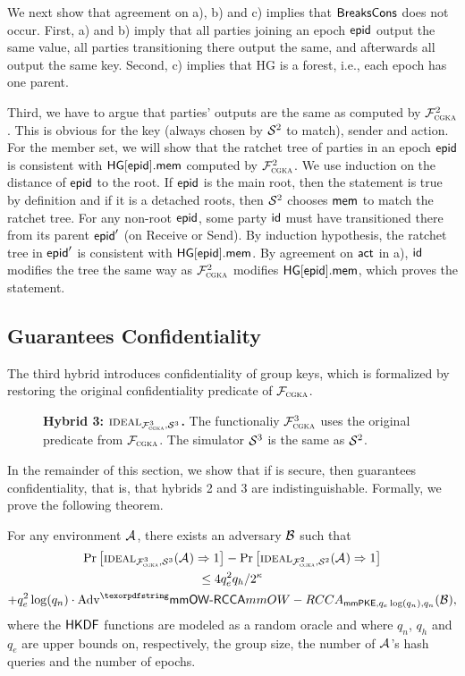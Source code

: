 We next show that agreement on a), b) and c) implies that $\textnormal{\textsf{BreaksCons}}$ does not occur. First, a) and b) imply that all parties joining an epoch ${\normalfont\textsf{epid}}$ output the same value, all parties transitioning there output the same, and afterwards all output the same key. Second, c) implies that HG is a forest, i.e., each epoch has one parent.

Third, we have to argue that parties' outputs are the same as computed by $\mathcal{F}_{\normalfont\textsc{cgka}}^2$. This is obvious for the key (always chosen by $\mathcal{S}_{\textsc{\relax}}^2$ to match), sender and action. For the member set, we will show that the ratchet tree of parties in an epoch ${\normalfont\textsf{epid}}$ is consistent with ${\mathsf{HG}}[{\normalfont\textsf{epid}}].\mathsf{mem}$ computed by $\mathcal{F}_{\normalfont\textsc{cgka}}^2$. We use induction on the distance of ${\normalfont\textsf{epid}}$ to the root. If ${\normalfont\textsf{epid}}$ is the main root, then the statement is true by definition and if it is a  detached roots, then $\mathcal{S}_{\textsc{\relax}}^2$ chooses $\mathsf{mem}$ to match the ratchet tree. For any non-root ${\normalfont\textsf{epid}}$, some party ${\mathsf{id}}$ must have transitioned there from its parent ${\normalfont\textsf{epid}}'$ (on Receive or Send). By induction hypothesis, the ratchet tree in ${\normalfont\textsf{epid}}'$ is consistent with ${\mathsf{HG}}[{\normalfont\textsf{epid}}].\mathsf{mem}$. By agreement on $\mathsf{act}$ in a), ${\mathsf{id}}$ modifies the tree the same way as $\mathcal{F}_{\normalfont\textsc{cgka}}^2$ modifies ${\mathsf{HG}}[{\normalfont\textsf{epid}}].\mathsf{mem}$, which proves the statement.

\subsection{\saik Guarantees Confidentiality}\label{sec:protsec4}
The third hybrid introduces confidentiality of group keys, which is formalized by restoring the original confidentiality predicate of $\mathcal{F}_{\normalfont\textsc{cgka}}$.
\begin{description}
\item[] {\bf Hybrid 3: $\textnormal{\textsc{ideal}}_{\mathcal{F}_{\normalfont\textsc{cgka}}^3, \mathcal{S}_{\textsc{\relax}}^3}$.} The functionaliy $\mathcal{F}_{\normalfont\textsc{cgka}}^3$ uses the original \KwConf{} predicate from $\mathcal{F}_{\normalfont\textsc{cgka}}$. The simulator $\mathcal{S}_{\textsc{\relax}}^3$ is the same as $\mathcal{S}_{\textsc{\relax}}^2$.
\end{description}

In the remainder of this section, we show that if \mmPKE is \mmowrcca secure, then \saik guarantees confidentiality, that is, that hybrids 2 and 3 are indistinguishable. Formally, we prove the following theorem.
\begin{theorem}

  For any environment $\mathcal{A}_{\relax}$, there exists an adversary $\mathcal{B}_{\relax}$ such that
  \normalfont
  \begin{multline*}
    \Pr\left[\ucideal_{\funcCGKA^3, \ucsim^3}(\Adv) \Rightarrow 1\right] - \Pr\left[\ucideal_{\funcCGKA^2,
        \ucsim^2}(\Adv) \Rightarrow 1\right]\\
    \leq 4q_e^2q_h/2^\kappa \\
    + q_e^2\log(q_n)\cdot\textnormal{Adv}^\mmowrcca_{\mmPKE,q_e\log(q_n),q_n}(\Bdv),
  \end{multline*}
  where the ${\mathsf{HKDF}}$ functions are modeled as a random oracle and where $q_n$, $q_h$ and $q_e$ are upper bounds on, respectively, the group size, the number of $\mathcal{A}_{\relax}$'s hash queries and the number of epochs.
\label{thm:hybrid2}\end{theorem}

